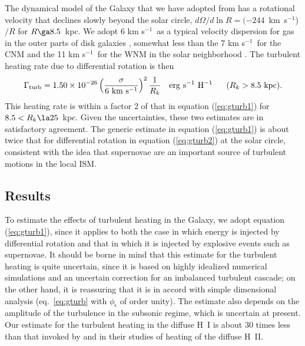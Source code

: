 \documentclass[12pt,preprint,flushrt]{aastex}
\newcommand{\beq}{\begin{equation}}
\newcommand{\eeq}{\end{equation}}
\newcommand{\e}{$^{-1}$}
\newcommand{\phied}{\phi_{{\dot\epsilon}}}
\newcommand{\gturb}{\Gamma_{\rm turb}}
\begin{document}
   The dynamical model of the Galaxy that we have adopted from
\cite{deh98} has a rotational velocity that declines
slowly beyond the solar circle,
$d\Omega/d\ln R=(-244$~km~s\e)$/R$ for
$R\ga 8.5$~kpc.
We adopt 6 km s\e\  as a typical
velocity dispersion for gas in the outer parts of disk galaxies
\citep[e.g.,][]{mar01},
somewhat less than the
7 km s\e\ for the CNM and the 11 km s\e\ for the WNM in
the solar neighborhood \citep{hei02}.
The turbulent heating rate due to differential rotation is then
\beq
\gturb=1.50\times 10^{-26}\left(\frac{\sigma}{6~{\rm km\ s^{-1}}}
                \right)^2\frac{1}{R_k}~~~{\rm erg\ s^{-1}\ H^{-1}}
                ~~~~~(R_k>8.5~{\rm kpc}).
\label{eq:gturb2}
\eeq
This heating rate is within a factor 2 of that in
equation (\ref{eq:gturb1}) for $8.5<R_k\la 25$~kpc.  Given
the uncertainties, these two estimates are in satisfactory
agreement.  The generic estimate in equation (\ref{eq:gturb1})
is about twice that for differential rotation in equation
(\ref{eq:gturb2}) at the solar circle, consistent with the
idea that supernovae are an important source of turbulent
motions in the local ISM.

\subsection{Results}


To estimate the effects of turbulent heating in the Galaxy,
we adopt equation (\ref{eq:gturb1}), since it applies to both the
case in which energy is injected by differential rotation
and that in which it is injected by explosive events such as supernovae.
It should be borne in mind that this estimate for the
turbulent heating is quite uncertain, since it is based on
highly idealized numerical simulations and an uncertain correction
for an imbalanced turbulent cascade; on the other hand, it is
reassuring that it is in accord with simple dimensional analysis
(eq.\ \ref{eq:gturb} with $\phied$ of order unity).
The estimate also depends on the amplitude of the turbulence
in the subsonic regime, which is uncertain at present.
Our estimate for the turbulent heating in the diffuse H~I is about
30 times less than that invoked by \cite{mintbal97} and
\cite{mathis00} in their studies of heating of the diffuse H~II.
\end{document}
